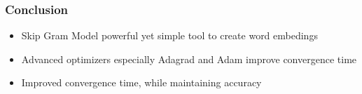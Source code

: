 \begin{frame}
\frametitle{Conclusion} 
\begin{itemize}
\item Skip Gram Model powerful yet simple tool to create word embedings
\item Advanced optimizers especially Adagrad and Adam improve convergence time 
\item Improved convergence time, while maintaining accuracy
\end{itemize}
\end{frame}